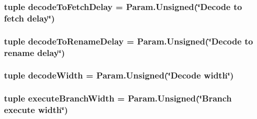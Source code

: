 \label{classOzoneCPU_1_1DerivOzoneCPU_a3df421018d58bcd7f02c3965f6b43ac3}
\hypertarget{classOzoneCPU_1_1DerivOzoneCPU_a9ef9ac64d6891064a22ab5d341e691f4}{
\subsubsection[{decodeToFetchDelay}]{\setlength{\rightskip}{0pt plus 5cm}tuple {\bf decodeToFetchDelay} = Param.Unsigned(\char`\"{}Decode to fetch delay\char`\"{})}}
\label{classOzoneCPU_1_1DerivOzoneCPU_a9ef9ac64d6891064a22ab5d341e691f4}
\hypertarget{classOzoneCPU_1_1DerivOzoneCPU_a168896b51e7cc580a9f343e0538ed193}{
\subsubsection[{decodeToRenameDelay}]{\setlength{\rightskip}{0pt plus 5cm}tuple {\bf decodeToRenameDelay} = Param.Unsigned(\char`\"{}Decode to rename delay\char`\"{})}}
\label{classOzoneCPU_1_1DerivOzoneCPU_a168896b51e7cc580a9f343e0538ed193}
\hypertarget{classOzoneCPU_1_1DerivOzoneCPU_a52dc575e0588181eb7c3bd1e3d803cfd}{
\subsubsection[{decodeWidth}]{\setlength{\rightskip}{0pt plus 5cm}tuple {\bf decodeWidth} = Param.Unsigned(\char`\"{}Decode {\bf width}\char`\"{})}}
\label{classOzoneCPU_1_1DerivOzoneCPU_a52dc575e0588181eb7c3bd1e3d803cfd}
\hypertarget{classOzoneCPU_1_1DerivOzoneCPU_a85784e938a57b92cd9d1eeaaca8500b1}{
\subsubsection[{executeBranchWidth}]{\setlength{\rightskip}{0pt plus 5cm}tuple {\bf executeBranchWidth} = Param.Unsigned(\char`\"{}Branch execute {\bf width}\char`\"{})}}
